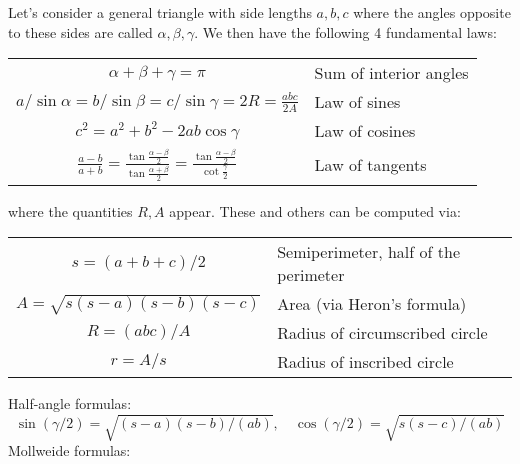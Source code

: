 \medskip
Let's consider a general triangle with side lengths $a,b,c$ where the angles opposite to these sides are called $\alpha, \beta, \gamma$. We then have the following 4 fundamental laws:

\medskip
\begin{tabular}{c l}
  $\alpha + \beta + \gamma = \pi$                       & Sum of interior angles \\
  $a / \sin \alpha = b / \sin \beta 
    = c / \sin \gamma 
    = 2R = \frac{abc}{2 A}$                             & Law of sines \\  
  $c^2 = a^2 + b^2 - 2ab \cos \gamma$                   & Law of cosines \\
  $\frac{a-b}{a+b} 
   = \frac{\tan \frac{\alpha-\beta}{2}}{\tan \frac{\alpha+\beta}{2}} 
   = \frac{\tan \frac{\alpha-\beta}{2}}{\cot \frac{\gamma}{2}}$
                                                        & Law of tangents \\
\end{tabular}
\medskip

where the quantities $R, A$ appear. These and others can be computed via:

\medskip
\begin{tabular}{c l}
  $s = (a+b+c)/2$                 & Semiperimeter, half of the perimeter \\
  $A = \sqrt{s(s-a)(s-b)(s-c)}$   & Area (via Heron's formula) \\
  $R = (abc)/ A$                  & Radius of circumscribed circle \\
  $r = A/s$                       & Radius of inscribed circle \\
\end{tabular}
\medskip

Half-angle formulas:
\begin{equation}
  \sin(\gamma / 2) = \sqrt{ (s-a)(s-b) / (a b)  },  \quad
  \cos(\gamma / 2) = \sqrt{ s(s-c) / (a b)  }
\end{equation}
Mollweide formulas:


